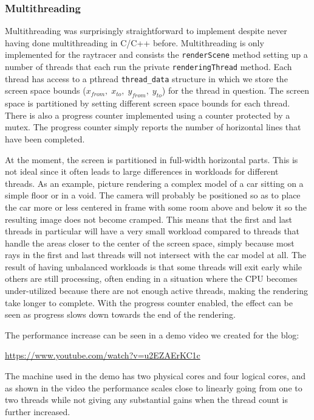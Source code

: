 \documentclass[a4paper,11pt]{article}
\begin{document}
\subsubsection{Multithreading}
Multithreading was surprisingly straightforward to implement despite never having done
multithreading in C/C++ before. Multithreading is only implemented for the raytracer and
consists the \texttt{renderScene} method setting up a number of threads that each run the
private \texttt{renderingThread} method. Each thread has access to a pthread \texttt{thread\_data} structure
in which we store the screen space bounds ($x_{from},\; x_{to},\; y_{from},\; y_{to}$) for the
thread in question. The screen space is partitioned by setting different screen space bounds
for each thread. There is also a progress counter implemented using a counter protected
by a mutex. The progress counter simply reports the number of horizontal lines
that have been completed.

At the moment, the screen is partitioned in full-width horizontal parts. This
is not ideal since it often leads to large differences in workloads for different threads. As an
example, picture rendering a complex model of a car sitting on a simple floor or in a void.
The camera will probably be positioned so as to place the car more or less centered in frame
with some room above and below it so the resulting image does not become cramped. This means
that the first and last threads in particular will have a very small workload compared to
threads that handle the areas closer to the center of the screen space, simply because most
rays in the first and last threads will not intersect with the car model at all. The result
of having unbalanced workloads is that some threads will exit early while others are still
processing, often ending in a situation where the CPU becomes under-utilized because there
are not enough active threads, making the rendering take longer to complete. With the progress
counter enabled, the effect can be seen as progress slows down towards the end of the
rendering.

The performance increase can be seen in a demo video we created for the blog:

\begin{center}\url{https://www.youtube.com/watch?v=u2EZAErKC1c}\end{center}

The machine used in the demo has two physical cores and four logical cores, and as shown
in the video the performance scales close to linearly going from one to two threads while not
giving any substantial gains when the thread count is further increased.
\end{document}
